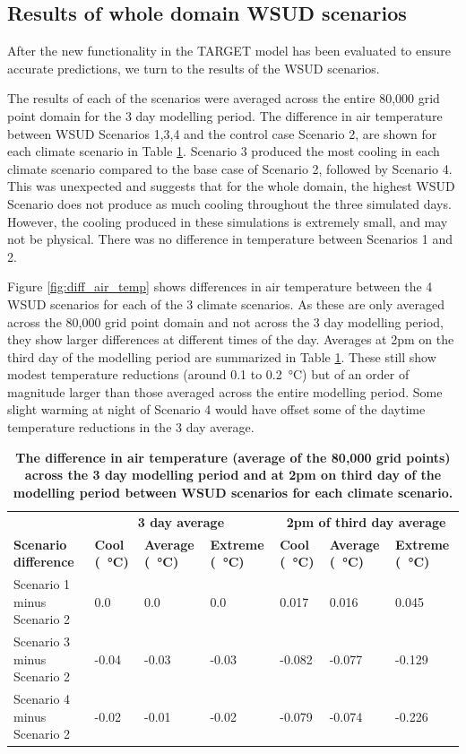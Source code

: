 \documentclass[final,3p,times,authoryear]{elsarticle}
\begin{document}
\subsection{Results of whole domain WSUD scenarios}\label{sec:whole_domain}
After the new functionality in the TARGET model has been evaluated to ensure accurate predictions, we turn to the results of the WSUD scenarios. 

The results of each of the scenarios were averaged across the entire 80,000 grid point domain for the 3 day modelling period. The difference in air temperature between WSUD Scenarios 1,3,4 and the control case Scenario 2, are shown for each climate scenario in Table \ref{tab:scenarioDiff}. Scenario 3 produced the most cooling in each climate scenario compared to the base case of Scenario 2, followed by Scenario 4. This was unexpected and suggests that for the whole domain, the highest WSUD Scenario does not produce as much cooling throughout the three simulated days. However, the cooling produced in these simulations is extremely small, and may not be physical. There was no difference in temperature between Scenarios 1 and 2. 

Figure \ref{fig:diff_air_temp} shows differences in air temperature between the 4 WSUD scenarios for each of the 3 climate scenarios. As these are only averaged across the 80,000 grid point domain and not across the 3 day modelling period, they show larger differences at different times of the day. Averages at 2pm on the third day of the modelling period are summarized in Table \ref{tab:scenarioDiff}. These still show modest temperature reductions (around 0.1 to 0.2\SI{}{\degreeCelsius}) but of an order of magnitude larger than those averaged across the entire modelling period. Some slight warming at night of Scenario 4 would have offset some of the daytime temperature reductions in the 3 day average.

\begin{table}[!htbp]
\caption{\bf The difference in air temperature (average of the 80,000 grid points) across the 3 day modelling period and at 2pm on third day of the modelling period between WSUD scenarios for each climate scenario.  \label{tab:scenarioDiff}}     
\begin{tabular}{ l l l l l l l}
 \hline  \multicolumn{1}{|c}{}   &  \multicolumn{3}{|c|}{\textbf{3 day average}} & \multicolumn{3}{c|}{\textbf{2pm of third day average}}  \\
\textbf{Scenario difference} 
& \textbf{Cool (\SI{}{\degreeCelsius})}
& \textbf{Average (\SI{}{\degreeCelsius})}
& \textbf{Extreme (\SI{}{\degreeCelsius})}
& \textbf{Cool (\SI{}{\degreeCelsius})}
& \textbf{Average (\SI{}{\degreeCelsius})}
& \textbf{Extreme (\SI{}{\degreeCelsius})}
\\ \hline
Scenario 1 minus Scenario 2 & 0.0  & 0.0 & 0.0       &0.017&0.016&0.045\\ 
Scenario 3 minus Scenario 2 & -0.04  & -0.03 & -0.03 &-0.082&-0.077&-0.129\\ 
Scenario 4 minus Scenario 2 & -0.02  & -0.01 & -0.02 &-0.079&-0.074&-0.226\\ 
\hline
\end{tabular}
\end{table}
\end{document}
